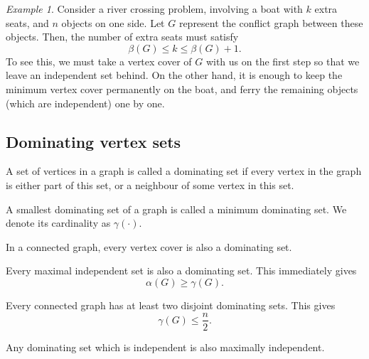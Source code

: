 \documentclass[11pt]{article}
\theoremstyle{definition}
\theoremstyle{remark}
\newtheorem*{example}{Example}
\numberwithin{equation}{section}
\begin{document}
    \begin{example}
        Consider a river crossing problem, involving a boat with $k$ extra seats, and
        $n$ objects on one side. Let $G$ represent the conflict graph between these
        objects. Then, the number of extra seats must satisfy \[
            \beta(G) \leq k \leq \beta(G) + 1.
        \] To see this, we must take a vertex cover of $G$ with us on the first step
        so that we leave an independent set behind. On the other hand, it is enough
        to keep the minimum vertex cover permanently on the boat, and ferry the
        remaining objects (which are independent) one by one.
    \end{example}

    \subsection{Dominating vertex sets}

    \begin{definition}
        A set of vertices in a graph is called a dominating set if every vertex in
        the graph is either part of this set, or a neighbour of some vertex in this
        set.
    \end{definition}

    \begin{definition}
        A smallest dominating set of a graph is called a minimum dominating set. We
        denote its cardinality as $\gamma(\cdot)$.
    \end{definition}

    \begin{lemma}
        In a connected graph, every vertex cover is also a dominating set.
    \end{lemma}

    \begin{lemma}
        Every maximal independent set is also a dominating set. This immediately
        gives \[
            \alpha(G) \geq \gamma(G).
        \] 
    \end{lemma}

    \begin{corollary}
        Every connected graph has at least two disjoint dominating sets. This gives
        \[
            \gamma(G) \leq \frac{n}{2}.
        \] 
    \end{corollary}

    \begin{definition}
        Any dominating set which is independent is also maximally independent.
    \end{definition}
    
\end{document}
